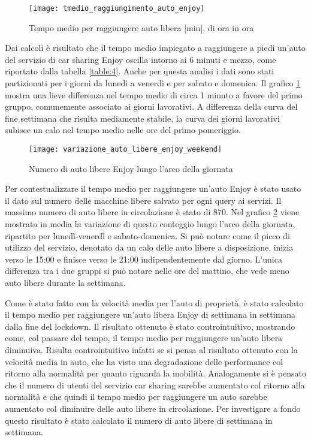 \begin{figure}[H]
	\texttt{[image: tmedio\_raggiungimento\_auto\_enjoy]}
	\caption{Tempo medio per raggiungere auto libera [min], di ora in ora}
	\label{image:8}
\end{figure}

Dai calcoli è risultato che il tempo medio impiegato a raggiungere a piedi un'auto del servizio di car sharing Enjoy oscilla intorno ai 6 minuti e mezzo, come riportato dalla tabella \ref{table:4}. Anche per questa analisi i dati sono stati partizionati per i giorni da lunedì a venerdì e per sabato e domenica. Il grafico \ref{image:8} mostra una lieve differenza nel tempo medio di circa 1 minuto a favore del primo gruppo, comunemente associato ai giorni lavorativi. A differenza della curva del fine settimana che risulta mediamente stabile, la curva dei giorni lavorativi subisce un calo nel tempo medio nelle ore del primo pomeriggio.

\begin{figure}[H]
\texttt{[image: variazione\_auto\_libere\_enjoy\_weekend]}
\caption{Numero di auto libere Enjoy lungo l'arco della giornata}
\label{image:9}
\end{figure}

Per contestualizzare il tempo medio per raggiungere un'auto Enjoy è stato usato il dato sul numero delle macchine libere salvato per ogni query ai servizi. Il massimo numero di auto libere in circolazione è stato di 870. Nel grafico \ref{image:9} viene mostrata in media la variazione di questo conteggio lungo l'arco della giornata, ripartito per lunedì-venerdì e sabato-domenica. Si può notare come il picco di utilizzo del servizio, denotato da un calo delle auto libere a disposizione, inizia verso le 15:00 e finisce verso le 21:00 indipendentemente dal giorno. L'unica differenza tra i due gruppi si può notare nelle ore del mattino, che vede meno auto libere durante la settimana.


Come è stato fatto con la velocità media per l'auto di proprietà, è stato calcolato il tempo medio per raggiungere un'auto libera Enjoy di settimana in settimana dalla fine del lockdown. Il risultato ottenuto è stato controintuitivo, mostrando come, col passare del tempo, il tempo medio per raggiungere un'auto libera diminuiva. Risulta controintuitivo infatti se si pensa al risultato ottenuto con la velocità media in auto, che ha visto una degradazione delle performance col ritorno alla normalità per quanto riguarda la mobilità. Analogamente si è pensato che il numero di utenti del servizio car sharing sarebbe aumentato col ritorno alla normalità e che quindi il tempo medio per raggiungere un auto sarebbe aumentato col diminuire delle auto libere in circolazione. Per investigare a fondo questo risultato è stato calcolato il numero di auto libere di settimana in settimana.

